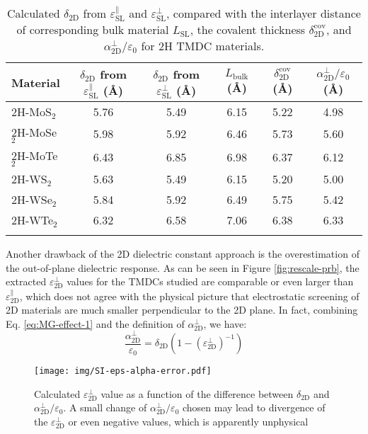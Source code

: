 \documentclass[manuscript=suppinfo,email=true,hyperref=true,keywords=false]{achemso}
\begin{document}
\begin{table}[htbp]
  \centering
  \begin{tabular}[htbp]{lccccc}
  \hline{}
  Material & $\delta_{\mathrm{2D}}$ from $\varepsilon_{\mathrm{SL}}^{\parallel}$ ({\AA}) & $\delta_{\mathrm{2D}}$ from $\varepsilon_{\mathrm{SL}}^{\perp}$ ({\AA})& $L_{\mathrm{bulk}}$ ({\AA}) & $\delta_{\mathrm{2D}}^{\mathrm{cov}}$ ({\AA}) & $\alpha_{\mathrm{2D}}^{\perp}/\varepsilon_{0}$ ({\AA})\\
  \hline{}
  2H-MoS$_{2}$ & 5.76 & 5.49 & 6.15 & 5.22 & 4.98\\
  2H-MoSe$_{2}$ & 5.98 & 5.92 & 6.46 &  5.73 & 5.60\\
  2H-MoTe$_{2}$ & 6.43 & 6.85 & 6.98 & 6.37 & 6.12\\
  2H-WS$_{2}$ & 5.63 & 5.49 & 6.15 & 5.20 & 5.00\\
  2H-WSe$_{2}$ & 5.84 & 5.92 & 6.49 & 5.75 & 5.42\\
  2H-WTe$_{2}$ & 6.32 & 6.58 & 7.06 & 6.38 & 6.33\\
  \hline{}
\end{tabular}

\caption{Calculated $\delta_{\mathrm{2D}}$ from
  $\varepsilon_{\mathrm{SL}}^{\parallel}$ and
  $\varepsilon_{\mathrm{SL}}^{\perp}$, compared with the interlayer
  distance of corresponding bulk material $L_{\mathrm{SL}}$, the
  covalent thickness $\delta_{\mathrm{2D}}^{\mathrm{cov}}$, and
  $\alpha_{\mathrm{2D}}^{\perp}/\varepsilon_{0}$ for 2H TMDC materials.}
\label{tab:delta-L-DFt}
\end{table}

Another drawback of the 2D dielectric constant approach is the
overestimation of the out-of-plane dielectric response. As can be seen
in Figure \ref{fig:rescale-prb}, the extracted
$\varepsilon_{\mathrm{2D}}^{\perp}$ values for the TMDCs studied
are comparable or even larger than
$\varepsilon_{\mathrm{2D}}^{\parallel}$, which does not agree with the
physical picture that electrostatic screening of 2D materials are much
smaller perpendicular to the 2D plane. In fact, combining
Eq. \ref{eq:MG-effect-1} and the definition of $\alpha_{\mathrm{2D}}^{\perp}$, we
have:
\begin{equation}
  \label{eq:eps-alpha-perp}
  \frac{\alpha_{\mathrm{2D}}^{\perp}}{\varepsilon_{0}} = \delta_{\mathrm{2D}}(1 - (\varepsilon_{\mathrm{2D}}^{\perp})^{-1})
\end{equation}

\begin{figure}[htbp]
  \centering
  \texttt{[image: img/SI-eps-alpha-error.pdf]}
  \caption{Calculated $\varepsilon_{\mathrm{2D}}^{\perp}$ value as a
    function of the difference between $\delta_{\mathrm{2D}}$ and
    $\alpha_{\mathrm{2D}}^{\perp}/\varepsilon_{0}$. A small change of
    $\alpha_{\mathrm{2D}}^{\perp}/\varepsilon_{0}$ chosen may lead to divergence of
    the $\varepsilon_{\mathrm{2D}}^{\perp}$ or even negative values,
    which is apparently unphysical}
  \label{fig:eps-alpha-error}
\end{figure}
\end{document}
